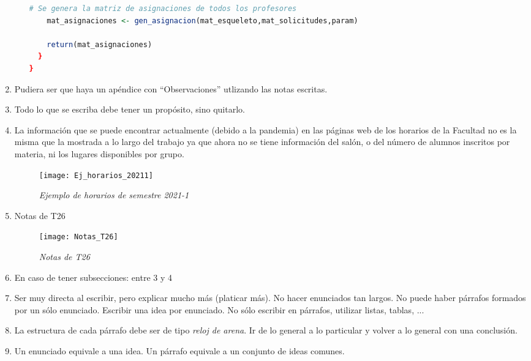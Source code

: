 \begin{appendices}
\begin{enumerate}
\begin{itemize}
\begin{lstlisting}[language=R, caption= \textit{Ejemplo de estructura de funciones}]
    # Se genera la matriz de asignaciones de todos los profesores
    mat_asignaciones <- gen_asignacion(mat_esqueleto,mat_solicitudes,param)
    
    return(mat_asignaciones)
  }
}
  \end{lstlisting}
  \end{itemize}
  
  \item Pudiera ser que haya un apéndice con ``Observaciones'' utlizando las notas escritas.
  
  \item Todo lo que se escriba debe tener un propósito, sino quitarlo.
  
  \item La información que se puede encontrar actualmente (debido a la pandemia) en las páginas web de los horarios de la Facultad no es la misma que la mostrada a lo largo del trabajo ya que ahora no se tiene información del salón, o del número de alumnos inscritos por materia, ni los lugares disponibles por grupo.
  
\begin{figure}[H]
\centering
\texttt{[image: Ej\_horarios\_20211]} %
\caption{\textit{Ejemplo de horarios de semestre 2021-1}}
\end{figure}
  
  \item Notas de T26
\begin{figure}[H]
\centering
\texttt{[image: Notas\_T26]} %
\caption{\textit{Notas de T26}}
\end{figure}
  
  \item En caso de tener subsecciones: entre 3 y 4
  
  \item Ser muy directa al escribir, pero explicar mucho más (platicar más). No hacer enunciados tan largos. No puede haber párrafos formados por un sólo enunciado. Escribir una idea por enunciado. No sólo escribir en párrafos, utilizar listas, tablas, ...  
  
  \item La estructura de cada párrafo debe ser de tipo \textit{reloj de arena}. Ir de lo general a lo particular y volver a lo general con una conclusión.
  
  \item Un enunciado equivale a una idea. Un párrafo equivale a un conjunto de ideas comunes.
  

\end{enumerate}
\end{appendices}
